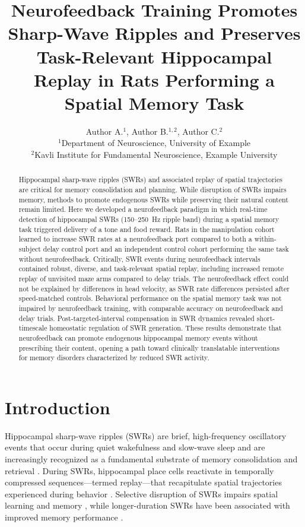 \documentclass[11pt]{article}
\title{Neurofeedback Training Promotes Sharp-Wave Ripples and Preserves Task-Relevant Hippocampal Replay in Rats Performing a Spatial Memory Task}
\author{Author A.$^{1}$, Author B.$^{1,2}$, Author C.$^{2}$ \\
\small $^{1}$Department of Neuroscience, University of Example \\
\small $^{2}$Kavli Institute for Fundamental Neuroscience, Example University}
\date{}
\begin{document}
\maketitle

\begin{abstract}
Hippocampal sharp-wave ripples (SWRs) and associated replay of spatial trajectories are critical for memory consolidation and planning. While disruption of SWRs impairs memory, methods to promote endogenous SWRs while preserving their natural content remain limited. Here we developed a neurofeedback paradigm in which real-time detection of hippocampal SWRs (150--250~Hz ripple band) during a spatial memory task triggered delivery of a tone and food reward. Rats in the manipulation cohort learned to increase SWR rates at a neurofeedback port compared to both a within-subject delay control port and an independent control cohort performing the same task without neurofeedback. Critically, SWR events during neurofeedback intervals contained robust, diverse, and task-relevant spatial replay, including increased remote replay of unvisited maze arms compared to delay trials. The neurofeedback effect could not be explained by differences in head velocity, as SWR rate differences persisted after speed-matched controls. Behavioral performance on the spatial memory task was not impaired by neurofeedback training, with comparable accuracy on neurofeedback and delay trials. Post-targeted-interval compensation in SWR dynamics revealed short-timescale homeostatic regulation of SWR generation. These results demonstrate that neurofeedback can promote endogenous hippocampal memory events without prescribing their content, opening a path toward clinically translatable interventions for memory disorders characterized by reduced SWR activity.
\end{abstract}

\section{Introduction}

Hippocampal sharp-wave ripples (SWRs) are brief, high-frequency oscillatory events that occur during quiet wakefulness and slow-wave sleep and are increasingly recognized as a fundamental substrate of memory consolidation and retrieval \citep{buzsaki2015}. During SWRs, hippocampal place cells reactivate in temporally compressed sequences---termed replay---that recapitulate spatial trajectories experienced during behavior \citep{foster2006,davidson2009}. Selective disruption of SWRs impairs spatial learning and memory \citep{girardeau2009,jadhav2012,ego2018}, while longer-duration SWRs have been associated with improved memory performance \citep{fernandezruiz2019}.
\end{document}
